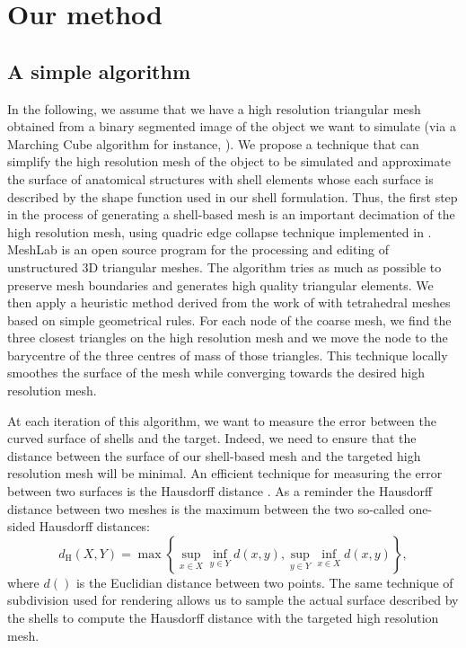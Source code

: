 \section{Our method}

	\subsection{A simple algorithm}
	
In the following, we assume that we have a high resolution triangular mesh obtained from a binary segmented image of the object we want to simulate (via a Marching Cube algorithm for instance, \cite{Lorensen87}). We propose a technique that can simplify the high resolution mesh of the object to be simulated and approximate the surface of anatomical structures with shell elements whose each surface is described by the shape function used in our shell formulation. Thus, the first step in the process of generating a shell-based mesh is an important decimation of the high resolution mesh, using quadric edge collapse technique implemented in \citeauthor{Meshlab}. MeshLab is an open source program for the processing and editing of unstructured 3D triangular meshes. The algorithm tries as much as possible to preserve mesh boundaries and generates high quality triangular elements. We then apply a heuristic method derived from the work of \cite{Saupin07} with tetrahedral meshes based on simple geometrical rules. For each node of the coarse mesh, we find the three closest triangles on the high resolution mesh and we move the node to the barycentre of the three centres of mass of those triangles. This technique locally smoothes the surface of the mesh while converging towards the desired high resolution mesh. 

At each iteration of this algorithm, we want to measure the error between the curved surface of shells and the target. Indeed, we need to ensure that the distance between the surface of our shell-based mesh and the targeted high resolution mesh will be minimal. An efficient technique for measuring the error between two surfaces is the Hausdorff distance \citep{Klein96}. As a reminder the Hausdorff distance between two meshes is the maximum between the two so-called one-sided Hausdorff distances:
\begin{equation}
d_{\mathrm{H}}(X,Y) = \max \left\{ \sup_{x \in X} \inf_{y \in Y} d(x,y), \sup_{y \in Y} \inf_{x \in X} d(x,y) \right\},
\end{equation}
where $d()$ is the Euclidian distance between two points. The same technique of subdivision used for rendering allows us to sample the actual surface described by the shells to compute the Hausdorff distance with the targeted high resolution mesh. 

